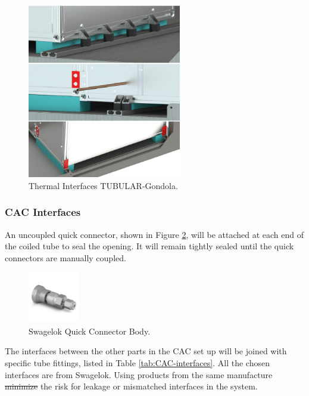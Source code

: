 \documentclass[a4paper,12pt,oneside]{article} %
\providecommand{\DIFaddtex}[1]{{\protect\color{blue}\uwave{#1}}} %
\providecommand{\DIFdeltex}[1]{{\protect\color{red}\sout{#1}}}                      %
\providecommand{\DIFaddbegin}{} %
\providecommand{\DIFaddend}{} %
\providecommand{\DIFdelbegin}{} %
\providecommand{\DIFdelend}{} %
\providecommand{\DIFaddbeginFL}{} %
\providecommand{\DIFaddendFL}{} %
\providecommand{\DIFdelbeginFL}{} %
\providecommand{\DIFdelendFL}{} %
\providecommand{\DIFadd}[1]{\texorpdfstring{\DIFaddtex{#1}}{#1}} %
\providecommand{\DIFdel}[1]{\texorpdfstring{\DIFdeltex{#1}}{}} %
\newcommand{\DIFscaledelfig}{0.5}
\newlength{\DIFdelgraphicswidth} %
\newlength{\DIFdelgraphicsheight} %
\newcommand{\DIFaddincludegraphics}[2][]{{\color{blue}\fbox{\DIFOincludegraphics[#1]{#2}}}} %
\newcommand{\DIFdelincludegraphics}[2][]{%
\sbox{\DIFdelgraphicsbox}{\DIFOincludegraphics[#1]{#2}}%
\settoboxwidth{\DIFdelgraphicswidth}{\DIFdelgraphicsbox} %
\settoboxtotalheight{\DIFdelgraphicsheight}{\DIFdelgraphicsbox} %
\scalebox{\DIFscaledelfig}{%
\parbox[b]{\DIFdelgraphicswidth}{\usebox{\DIFdelgraphicsbox}\\[-\baselineskip] \rule{\DIFdelgraphicswidth}{0em}}\llap{\resizebox{\DIFdelgraphicswidth}{\DIFdelgraphicsheight}{%
\setlength{\unitlength}{\DIFdelgraphicswidth}%
\begin{picture}(1,1)%
\thicklines\linethickness{2pt} %
{\color[rgb]{1,0,0}\put(0,0){\framebox(1,1){}}}%
{\color[rgb]{1,0,0}\put(0,0){\line( 1,1){1}}}%
{\color[rgb]{1,0,0}\put(0,1){\line(1,-1){1}}}%
\end{picture}%
}\hspace*{3pt}}} %
} %
\DeclareRobustCommand{\DIFaddbegin}{\DIFOaddbegin \let\includegraphics\DIFaddincludegraphics} %
\DeclareRobustCommand{\DIFaddend}{\DIFOaddend \let\includegraphics\DIFOincludegraphics} %
\DeclareRobustCommand{\DIFdelbegin}{\DIFOdelbegin \let\includegraphics\DIFdelincludegraphics} %
\DeclareRobustCommand{\DIFdelend}{\DIFOaddend \let\includegraphics\DIFOincludegraphics} %
\DeclareRobustCommand{\DIFaddbeginFL}{\DIFOaddbeginFL \let\includegraphics\DIFaddincludegraphics} %
\DeclareRobustCommand{\DIFaddendFL}{\DIFOaddendFL \let\includegraphics\DIFOincludegraphics} %
\DeclareRobustCommand{\DIFdelbeginFL}{\DIFOdelbeginFL \let\includegraphics\DIFdelincludegraphics} %
\DeclareRobustCommand{\DIFdelendFL}{\DIFOaddendFL \let\includegraphics\DIFOincludegraphics} %
\begin{document}
\begin{figure}[H]
    \centering
    \DIFdelbeginFL %
\DIFdelendFL \DIFaddbeginFL \includegraphics[width=0.6\textwidth]{4-experiment-design/img/Mechanical/gondola_fixation.png}
    \DIFaddendFL \caption{Thermal Interfaces TUBULAR-Gondola.}
    \label{fig:thermal_interface}
\end{figure}

\subsubsection{CAC Interfaces}
An uncoupled quick connector, shown in Figure \ref{fig:Quick-connector-body}, will be attached at each end of the coiled tube to seal the opening. It will remain tightly sealed until the quick connectors are manually coupled. 

\begin{figure}[H]
    \centering
    \includegraphics[width=0.2\textwidth]{4-experiment-design/img/Mechanical/CAC-QC-Outlet.jpg}
    \caption{Swagelok Quick Connector Body.}
    \label{fig:Quick-connector-body}
\end{figure}

The interfaces between the other parts in the CAC set up will be joined with specific tube fittings, listed in Table \ref{tab:CAC-interfaces}. All the chosen interfaces are from Swagelok. Using products from the same manufacture \DIFdelbegin \DIFdel{minimize }\DIFdelend \DIFaddbegin \DIFadd{minimizes }\DIFaddend the risk for leakage or mismatched interfaces in the system. 
\end{document}
